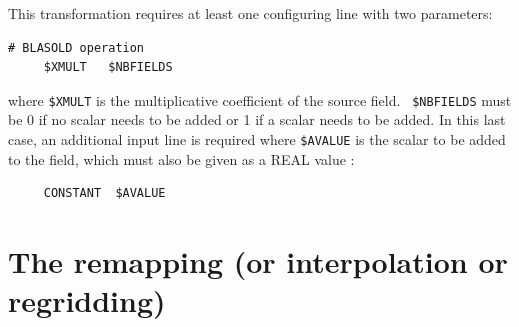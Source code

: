 \begin{itemize}
  This transformation requires at least one configuring line with two
  parameters:
 \begin{verbatim}
# BLASOLD operation
     $XMULT   $NBFIELDS 
\end{verbatim}
  where {\tt \$XMULT} is the multiplicative coefficient of the source
  field. {\tt
    \$NBFIELDS} must be 0 if no scalar needs to be added or 1 if a
  scalar needs to be added. In this last case, an additional input
  line is required where {\tt \$AVALUE} is the scalar to be added to
  the field, which must also be given as a REAL value :
\begin{verbatim}
     CONSTANT  $AVALUE
\end{verbatim} 
\end{itemize}


\section{The remapping (or interpolation or regridding)}
\label{subsec_interp}

